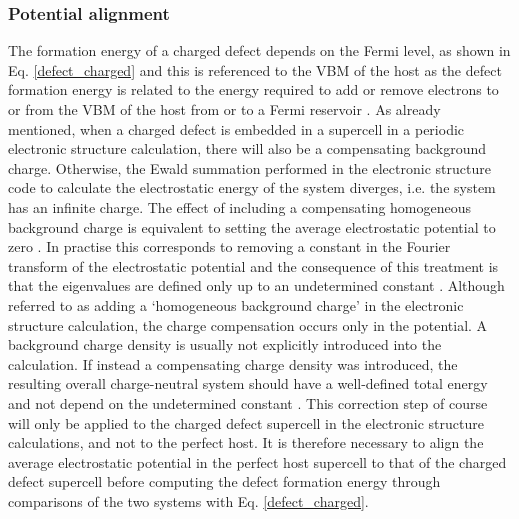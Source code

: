 \documentclass[11pt, twoside]{report}
\begin{document}
\subsubsection{Potential alignment}
The formation energy of a charged defect depends on the Fermi level, as shown in Eq. \ref{defect_charged} and this is referenced to the VBM of the host as the defect formation energy is related to the energy required to add or remove electrons to or from the VBM of the host from or to a Fermi reservoir \cite{Alex_defects}.
As already mentioned, when a charged defect is embedded in a supercell in a periodic electronic structure calculation, there will also be a compensating background charge. Otherwise, the Ewald summation performed in the electronic structure code to calculate the electrostatic energy of the system diverges, i.e. the system has an infinite charge. The effect of including a compensating homogeneous background charge is equivalent to setting the average electrostatic potential to zero \cite{freysoldt_rev}. 
In practise this corresponds to removing a constant in the Fourier transform of the electrostatic potential and the consequence of this treatment is that the eigenvalues are defined only up to an undetermined constant \cite{kumagai_oba, kumagai_oba_9}.
Although referred to as adding a `homogeneous background charge' in the electronic structure calculation, the charge compensation occurs only in the potential. A background charge density is usually not explicitly introduced into the calculation. If instead a compensating charge density was introduced, the resulting overall charge-neutral system should have a well-defined total energy and not depend on the undetermined constant \cite{Lany_defects, Lany_defects_2008}.
This correction step of course will only be applied to the charged defect supercell in the electronic structure calculations, and not to the perfect host. It is therefore necessary to align the average electrostatic potential in the perfect host supercell to that of the charged defect supercell before computing the defect formation energy through comparisons of the two systems with Eq. \ref{defect_charged}.
 
\end{document}
